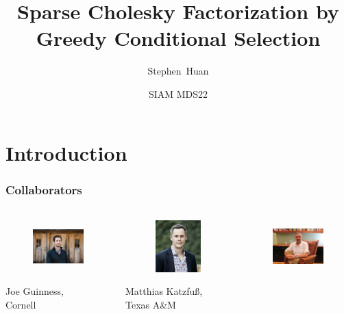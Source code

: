 \documentclass{beamer}                             %
\title[]{Sparse Cholesky Factorization by \\ Greedy Conditional Selection}
\subtitle{}
\author[Huan]{Stephen\ Huan}
\institute[Georgia Institute of Technology]
{
  \url{https://stephen-huan.github.io/projects/cholesky/}
}
\date[]{SIAM MDS22}
\begin{document}
\section{Introduction}

\frame{\titlepage}

\begin{frame}
\frametitle{Collaborators}
\framesubtitle{}
  \begin{columns}
    \begin{column}{0.22\textwidth}
      \centering
      \begin{figure}[h!]
        \centering
        \includegraphics[width=2cm, height=2cm,
          trim={26.88px 0 26.88px 0}, clip]
          {figures/people/joe_guinness.jpg}
      \end{figure}
      Joe Guinness, \\ Cornell
    \end{column}
    \begin{column}{0.28\textwidth}
      \centering
      \begin{figure}[h!]
        \centering
        \includegraphics[width=2cm, height=2cm,
          trim={0 65px 0 0px}, clip]
          {figures/people/matthias_katzfuss.png}
      \end{figure}
      Matthias Katzfu{\ss}, \\ Texas A\&M
    \end{column}
    \begin{column}{0.26\textwidth}
      \centering
      \begin{figure}[h!]
        \centering
        \includegraphics[width=2cm, height=2cm,
          trim={33.75px 0 33.75px 0}, clip]
          {figures/people/houman_owhadi.jpg}

\end{figure}
\end{column}
\end{columns}
\end{frame}
\end{document}
